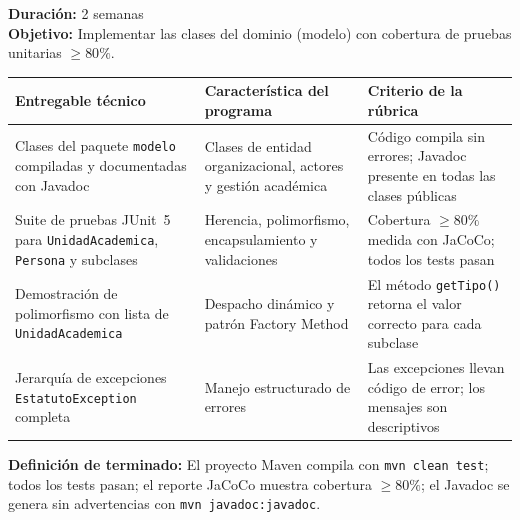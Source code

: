 \begin{tcolorbox}[sprintBox, title={Sprint 6 — Clases del dominio y pruebas unitarias}]
\textbf{Duración:} 2 semanas\\[4pt]
\textbf{Objetivo:} Implementar las clases del dominio (modelo) con cobertura de pruebas unitarias $\geq 80\%$.

\vspace{6pt}
\begin{tabularx}{\linewidth}{@{}L{4cm}L{4cm}L{4.5cm}@{}}
\toprule
\textbf{Entregable técnico} & \textbf{Característica del programa} & \textbf{Criterio de la rúbrica} \\
\midrule
Clases del paquete \texttt{modelo} compiladas y documentadas con Javadoc &
  Clases de entidad organizacional, actores y gestión académica &
  Código compila sin errores; Javadoc presente en todas las clases públicas \\
\addlinespace
Suite de pruebas JUnit~5 para \texttt{UnidadAcademica}, \texttt{Persona} y subclases &
  Herencia, polimorfismo, encapsulamiento y validaciones &
  Cobertura $\geq 80\%$ medida con JaCoCo; todos los tests pasan \\
\addlinespace
Demostración de polimorfismo con lista de \texttt{UnidadAcademica} &
  Despacho dinámico y patrón Factory Method &
  El método \texttt{getTipo()} retorna el valor correcto para cada subclase \\
\addlinespace
Jerarquía de excepciones \texttt{EstatutoException} completa &
  Manejo estructurado de errores &
  Las excepciones llevan código de error; los mensajes son descriptivos \\
\bottomrule
\end{tabularx}

\vspace{8pt}
\textbf{Definición de terminado:} El proyecto Maven compila con \texttt{mvn clean test};
todos los tests pasan; el reporte JaCoCo muestra cobertura $\geq 80\%$;
el Javadoc se genera sin advertencias con \texttt{mvn javadoc:javadoc}.
\end{tcolorbox}

\vspace{10pt}

